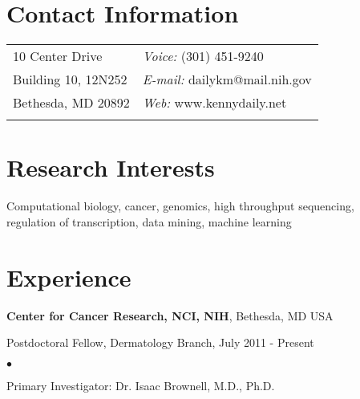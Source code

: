 \documentclass[margin,line]{res}
\newenvironment{list1}{
  \begin{list}{\ding{113}}{%
      \setlength{\itemsep}{0in}
      \setlength{\parsep}{0in} \setlength{\parskip}{0in}
      \setlength{\topsep}{0in} \setlength{\partopsep}{0in} 
      \setlength{\leftmargin}{0.17in}}}{\end{list}}
\newenvironment{list2}{
  \begin{list}{$\bullet$}{%
      \setlength{\itemsep}{0in}
      \setlength{\parsep}{0in} \setlength{\parskip}{0in}
      \setlength{\topsep}{0in} \setlength{\partopsep}{0in} 
      \setlength{\leftmargin}{0.2in}}}{\end{list}}
\begin{document}

\begin{resume}
\section{\sc Contact Information}
\vspace{.05in}
\begin{tabular}{@{}p{3in}p{4in}}
 10 Center Drive & {\it Voice:}  (301) 451-9240 \\
 Building 10, 12N252 &  {\it E-mail:} dailykm@mail.nih.gov\\         
 Bethesda, MD 20892 &  {\it Web:} www.kennydaily.net\\       
 & \\     
\end{tabular}


\section{\sc Research Interests}
Computational biology, cancer, genomics, high throughput sequencing,\\
regulation of transcription, data mining, machine learning

\section{\sc Experience}
        {\bf Center for Cancer Research, NCI, NIH}, Bethesda, MD USA\\
        \vspace*{-.1in}
        \begin{list1}
        \item[] Postdoctoral Fellow, Dermatology Branch, July 2011 - Present
          \begin{list2}
            \vspace*{.025in}
          \item Primary Investigator: Dr. Isaac Brownell, M.D., Ph.D.
          \end{list2}
        \end{list1}


\end{resume}
\end{document}
